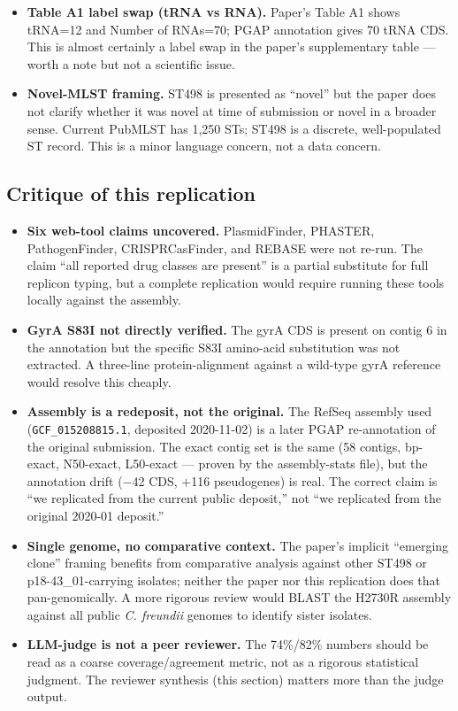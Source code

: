 \documentclass[11pt]{article}
\begin{document}
\begin{itemize}
      reader should not read the resistome list as a substitute for AST.
\item \textbf{Table A1 label swap (tRNA vs RNA).} Paper's Table A1 shows tRNA=12 and Number of
      RNAs=70; PGAP annotation gives 70 tRNA CDS. This is almost certainly a label swap in the
      paper's supplementary table --- worth a note but not a scientific issue.
\item \textbf{Novel-MLST framing.} ST498 is presented as ``novel'' but the paper does not clarify
      whether it was novel at time of submission or novel in a broader sense. Current PubMLST has
      1{,}250 STs; ST498 is a discrete, well-populated ST record. This is a minor language
      concern, not a data concern.
\end{itemize}

\subsection*{Critique of this replication}
\begin{itemize}
\item \textbf{Six web-tool claims uncovered.} PlasmidFinder, PHASTER, PathogenFinder,
      CRISPRCasFinder, and REBASE were not re-run. The claim ``all reported drug classes are
      present'' is a partial substitute for full replicon typing, but a complete replication
      would require running these tools locally against the assembly.
\item \textbf{GyrA S83I not directly verified.} The gyrA CDS is present on contig 6 in the
      annotation but the specific S83I amino-acid substitution was not extracted. A three-line
      protein-alignment against a wild-type gyrA reference would resolve this cheaply.
\item \textbf{Assembly is a redeposit, not the original.} The RefSeq assembly used
      (\texttt{GCF\_015208815.1}, deposited 2020-11-02) is a later PGAP re-annotation of the
      original submission. The exact contig set is the same (58 contigs, bp-exact, N50-exact,
      L50-exact --- proven by the assembly-stats file), but the annotation drift ($-$42 CDS,
      $+$116 pseudogenes) is real. The correct claim is ``we replicated from the current public
      deposit,'' not ``we replicated from the original 2020-01 deposit.''
\item \textbf{Single genome, no comparative context.} The paper's implicit ``emerging clone''
      framing benefits from comparative analysis against other ST498 or p18-43\_01-carrying
      isolates; neither the paper nor this replication does that pan-genomically. A more rigorous
      review would BLAST the H2730R assembly against all public \emph{C. freundii} genomes to
      identify sister isolates.
\item \textbf{LLM-judge is not a peer reviewer.} The 74\%/82\% numbers should be read as a
      coarse coverage/agreement metric, not as a rigorous statistical judgment. The reviewer
      synthesis (this section) matters more than the judge output.
\end{itemize}
\end{document}
